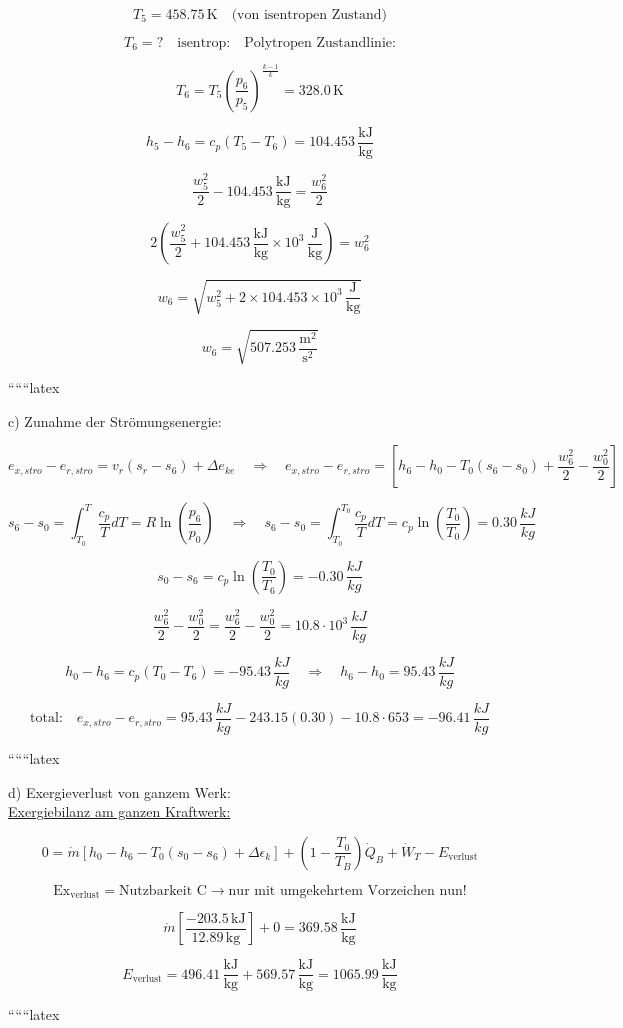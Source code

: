 \[
T_5 = 458.75 \, \text{K} \quad \text{(von isentropen Zustand)}
\]

\[
T_6 = ? \quad \text{isentrop:} \quad \text{Polytropen Zustandlinie:}
\]

\[
T_6 = T_5 \left( \frac{p_6}{p_5} \right)^{\frac{k-1}{k}} = 328.0 \, \text{K}
\]

\[
h_5 - h_6 = c_p (T_5 - T_6) = 104.453 \, \frac{\text{kJ}}{\text{kg}}
\]

\[
\frac{w_5^2}{2} - 104.453 \, \frac{\text{kJ}}{\text{kg}} = \frac{w_6^2}{2}
\]

\[
2 \left( \frac{w_5^2}{2} + 104.453 \, \frac{\text{kJ}}{\text{kg}} \times 10^3 \, \frac{\text{J}}{\text{kg}} \right) = w_6^2
\]

\[
w_6 = \sqrt{w_5^2 + 2 \times 104.453 \times 10^3 \, \frac{\text{J}}{\text{kg}}}
\]

\[
w_6 = \sqrt{507.253 \, \frac{\text{m}^2}{\text{s}^2}}
\]

``````latex


c) Zunahme der Strömungsenergie:

\[
e_{x,stro} - e_{r,stro} = v_r (s_{r} - s_{6}) + \Delta e_{ke} \quad \Rightarrow \quad e_{x,stro} - e_{r,stro} = \left[ h_6 - h_0 - T_0 (s_6 - s_0) + \frac{w_6^2}{2} - \frac{w_0^2}{2} \right]
\]

\[
s_6 - s_0 = \int_{T_0}^{T} \frac{c_p}{T} dT = R \ln \left( \frac{p_6}{p_0} \right) \quad \Rightarrow \quad s_6 - s_0 = \int_{T_0}^{T_0} \frac{c_p}{T} dT = c_p \ln \left( \frac{T_0}{T_0} \right) = 0.30 \, \frac{kJ}{kg}
\]

\[
s_0 - s_6 = c_p \ln \left( \frac{T_0}{T_6} \right) = -0.30 \, \frac{kJ}{kg}
\]

\[
\frac{w_6^2}{2} - \frac{w_0^2}{2} = \frac{w_6^2}{2} - \frac{w_0^2}{2} = 10.8 \cdot 10^3 \, \frac{kJ}{kg}
\]

\[
h_0 - h_6 = c_p (T_0 - T_6) = -95.43 \, \frac{kJ}{kg} \quad \Rightarrow \quad h_6 - h_0 = 95.43 \, \frac{kJ}{kg}
\]

\[
\text{total:} \quad e_{x,stro} - e_{r,stro} = 95.43 \, \frac{kJ}{kg} - 243.15 \left( 0.30 \right) - 10.8 \cdot 653 = -96.41 \, \frac{kJ}{kg}
\]

``````latex


d) Exergieverlust von ganzem Werk: \\
\underline{Exergiebilanz am ganzen Kraftwerk:}

\[
0 = \dot{m} \left[ h_0 - h_6 - T_0 (s_0 - s_6) + \Delta \epsilon_k \right] + \left( 1 - \frac{T_0}{T_B} \right) \dot{Q}_B + \dot{W}_T - E_{\text{verlust}}
\]

\[
\text{Ex}_{\text{verlust}} = \text{Nutzbarkeit C} \rightarrow \text{nur mit umgekehrtem Vorzeichen nun!}
\]

\[
\dot{m} \left[ \frac{-203.5 \, \text{kJ}}{12.89 \, \text{kg}} \right] + 0 = 369.58 \, \frac{\text{kJ}}{\text{kg}}
\]

\[
E_{\text{verlust}} = 496.41 \, \frac{\text{kJ}}{\text{kg}} + 569.57 \, \frac{\text{kJ}}{\text{kg}} = 1065.99 \, \frac{\text{kJ}}{\text{kg}}
\]

``````latex


